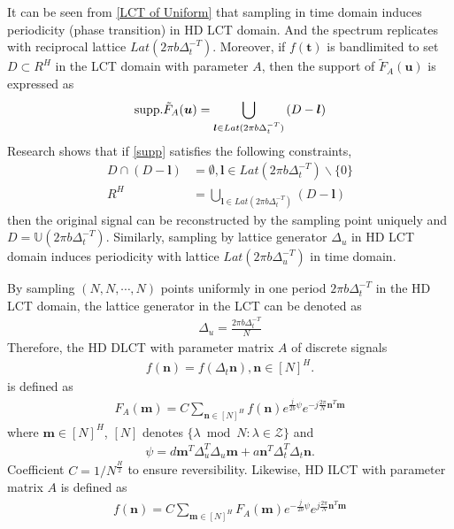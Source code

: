 \documentclass[journal]{IEEEtran}
\begin{document}
It can be seen from \eqref{LCT of Uniform} that sampling in time domain induces periodicity (phase transition) in HD LCT domain. And the spectrum replicates with reciprocal lattice $ Lat(2\pi b\Delta _t^{- T}) $. 
Moreover, if $f (\boldsymbol t)$ is bandlimited to set $D\subset {R^H}$ in the LCT domain with parameter $A$, then the support of $\tilde F _ A ( \boldsymbol u )$ is expressed as 
\begin{align}
	{\rm{supp}}.{{\tilde F}_A}({\boldsymbol{u}}) = \bigcup\limits_{\boldsymbol l \in Lat(2\pi b\Delta _t^{ - T})} {(D - \boldsymbol l)} 
	\label{supp}
\end{align}
Research shows that if \eqref{supp} satisfies the following constraints,
\begin{align}
	D \cap (D -\boldsymbol l) &= \emptyset , \boldsymbol l \in Lat(2\pi b\Delta _t^{ - T})\backslash \{ 0\} \\
	{R^H} &= \bigcup\limits_{\boldsymbol l \in Lat(2\pi b\Delta _t^{ - T})} {(D -\boldsymbol l)} 
\end{align}
then the original signal can be reconstructed by the sampling point uniquely and $D = \mathbb{U} (2 \pi b\Delta _t^{ - T})$. Similarly, sampling by lattice generator $\Delta _u$ in HD LCT domain induces periodicity with lattice $ Lat(2\pi b\Delta _u^{- T}) $ in time domain.

By sampling $(N, N, \cdots, N)$ points uniformly in one period $2\pi b\Delta _t^{- T}$ in the HD LCT domain, the lattice generator in the LCT can be denoted as 
\begin{align}
	{\Delta _u} = \frac{{2\pi b\Delta _t^{ - T}}}{N}
\end{align}
Therefore, the HD DLCT with parameter matrix $A$ of discrete signals 
\begin{align}
	f(\boldsymbol n) = f({\Delta _t}{\boldsymbol{n}}),\boldsymbol n \in {[N]^H}.
\end{align} is defined as
\begin{align}
	{F_A}(\boldsymbol m) =C \sum\limits_{\boldsymbol n \in {{[N]}^H}} {f(\boldsymbol n){e^{\frac{j}{{2b}}\psi}e^{  - j\frac{{2\pi }}{N}{\boldsymbol n^T}\boldsymbol m}}}
	\label{DLCT}
\end{align}
where $\boldsymbol m \in {{[N]}^H}$, $[N]$ denotes $\{ \lambda \bmod N:\lambda  \in \mathcal Z\} $ and 
\begin{align}
		\psi=d{\boldsymbol m^{T}}\Delta _u^T{\Delta _u}\boldsymbol m + a{\boldsymbol n^{T}}\Delta _t^T{\Delta _t}\boldsymbol n .
\end{align}
Coefficient $C=1/{{N^{\frac{H}{2}}}}$ to ensure reversibility. Likewise, HD ILCT with parameter matrix $A$ is defined as
\begin{align}
		{f}(\boldsymbol n) = C\sum\limits_{\boldsymbol m \in { {[N]}^H}} {F_A(\boldsymbol m){e^{-\frac{j}{{2b}}\psi}e^{ j\frac{{2\pi }}{N}{\boldsymbol n^T}\boldsymbol m}}} 
		\label{IDLCT}
\end{align}
\end{document}
